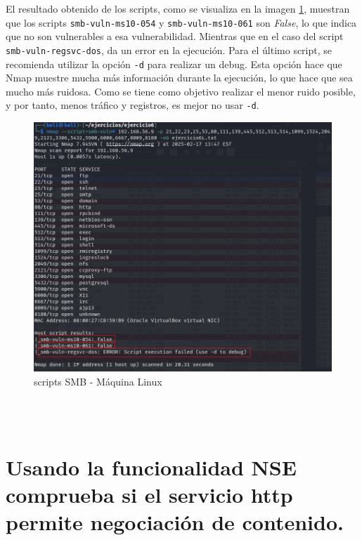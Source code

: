 \documentclass[a4paper,12pt]{article} %
\begin{document}
El resultado obtenido de los scripts, como se visualiza en la imagen \ref{fig:eje6Linuxm}, muestran que los scripts \texttt{smb-vuln-ms10-054} y \texttt{smb-vuln-ms10-061} son \textit{False}, lo que indica que no son vulnerables a esa vulnerabilidad. Mientras que en el caso del script \texttt{smb-vuln-regsvc-dos}, da un error en la ejecución. Para el último script, se recomienda utilizar la opción \texttt{-d} para realizar un debug. Esta opción hace que Nmap muestre mucha más información durante la ejecución, lo que hace que sea mucho más ruidosa. Como se tiene como objetivo realizar el menor ruido posible, y por tanto, menos tráfico y registros, es mejor no usar \texttt{-d}.
\newpage
    \begin{figure} [hp!]
         \centering
         \includegraphics[width=1\textwidth]{Imagenes/eje6Linux.png}
         \caption{scripts SMB - Máquina Linux}
         \label{fig:eje6Linuxm}
    \end{figure}

    

\newpage
\\ \\
\section{Usando la funcionalidad NSE comprueba si el servicio http permite negociación de contenido.}
\\
\end{document}
